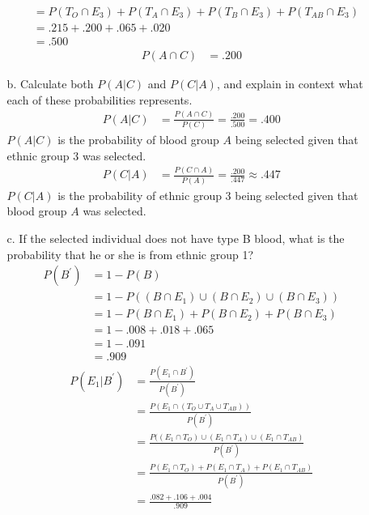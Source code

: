 \documentclass[letterpaper,12pt]{article}
\begin{document}
\begin{enumerate}
\begin{enumerate}
\begin{align*}
          &= P(T_{O} \cap E_3) + P(T_{A} \cap E_3) + P(T_{B} \cap E_3) + P(T_{AB} \cap E_3) \\
          &= .215 + .200 + .065 + .020 \\
          &= .500
        \end{align*}
        \begin{align*}
          P(A \cap C) &= .200
        \end{align*}
      \item[b.]
        Calculate both $P(A|C)$ and $P(C|A)$, and explain in context what each of these probabilities represents.
        \begin{align*}
          P(A|C) &= \frac{P(A \cap C)}{P(C)} = \frac{.200}{.500} = .400
        \end{align*}
        $P(A|C)$ is the probability of blood group $A$ being selected given that ethnic group 3 was selected.
        \begin{align*}
          P(C|A) &= \frac{P(C \cap A)}{P(A)} = \frac{.200}{.447} \approx .447
        \end{align*}
        $P(C|A)$ is the probability of ethnic group 3 being selected given that blood group $A$ was selected.
      \item[c.]
        If the selected individual does not have type B blood, what is the probability that he or she is from ethnic group 1?
        \begin{align*}
          P(B^\prime) &= 1 - P(B) \\
          &= 1 - P((B \cap E_1) \cup (B \cap E_2) \cup (B \cap E_3)) \\
          &= 1 - P(B \cap E_1) + P(B \cap E_2) + P(B \cap E_3) \\
          &= 1 - .008 + .018 + .065 \\
          &= 1 - .091 \\
          &= .909
        \end{align*}
        \begin{align*}
          P(E_1|B^\prime) &= \frac{P(E_1 \cap B^\prime)}{P(B^\prime)} \\
          &= \frac{P(E_1 \cap (T_O \cup T_A \cup T_{AB}))}{P(B^\prime)} \\
          &= \frac{P((E_1 \cap T_O) \cup (E_1 \cap T_A) \cup (E_1 \cap T_{AB})}{P(B^\prime)} \\
          &= \frac{P(E_1 \cap T_O) + P(E_1 \cap T_A) + P(E_1 \cap T_{AB})}{P(B^\prime)} \\
          &= \frac{.082 + .106 + .004}{.909} \\

\end{align*}
\end{enumerate}
\end{enumerate}
\end{document}
